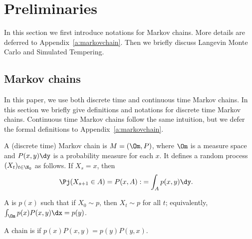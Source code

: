
\section{Preliminaries}

In this section we first introduce notations for Markov chains. More details are deferred to Appendix~\ref{a:markovchain}. Then we briefly discuss Langevin Monte Carlo and Simulated Tempering.

\subsection{Markov chains}

In this paper, we use both discrete time and continuous time Markov chains. In this section we briefly give definitions and notations for discrete time Markov chains. Continuous time Markov chains follow the same intuition, but we defer the formal definitions to Appendix~\ref{a:markovchain}. 

\begin{df}
A (discrete time) Markov chain is $M=(\Om,P)$, where $\Om$ is a measure space and $P(x,y)\dy$ is a probability measure for each $x$.
It defines a random process $(X_t)_{t\in \N_0}$ as follows. If $X_s=x$, then 
\begin{align}
\Pj(X_{s+1}\in A) = P(x,A) :&=\int_A p(x,y)\dy. 
\end{align}

A  is $p(x)$ such that if $X_0\sim p$, then $X_t\sim p$ for all $t$; equivalently, $\int_\Om p(x) P(x,y) \dx = p(y)$. 

A chain is  if $p(x)P(x,y) = p(y) P(y,x)$. 
\end{df}

